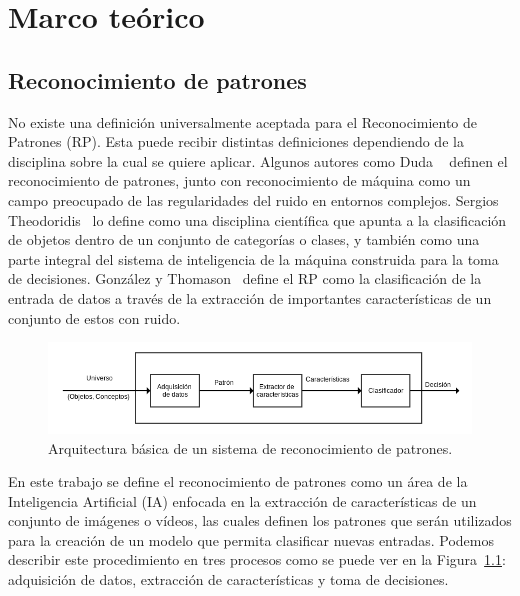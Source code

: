 \chapter[Marco teórico]{Marco teórico}
\label{ch:estado_del_arte}

\section{Reconocimiento de patrones}
\label{sec:rec_patrones}
	No existe una definición universalmente aceptada para el Reconocimiento de Patrones (RP). Esta puede recibir distintas definiciones dependiendo de la disciplina sobre la cual se quiere aplicar. Algunos autores como Duda \etal~\cite{Duda1973} definen el reconocimiento de patrones, junto con reconocimiento de máquina como un campo preocupado de las regularidades del ruido en entornos complejos. Sergios Theodoridis~\cite{Theodoridis2008} lo define como una disciplina científica que apunta a la clasificación de objetos dentro de un conjunto de categorías o clases, y también como una parte integral del sistema de inteligencia de la máquina construida para la toma de decisiones. González y Thomason~\cite{Gonzalez1978} define el RP como la clasificación de la entrada de datos a través de la extracción de importantes características de un conjunto de estos con ruido. 

\begin{figure}[b]
  \centering
   \includegraphics[width=1\textwidth]{Figuras/Diagramas/estado_del_arte/Reconocimiento_de_patrones.png}
  \caption{Arquitectura básica de un sistema de reconocimiento de patrones.}
  \label{art:fig:arquitectura}
\end{figure}


En este trabajo se define el reconocimiento de patrones como un área de la Inteligencia Artificial (IA) enfocada en la extracción de características de un conjunto de imágenes o vídeos, las cuales definen los patrones que serán utilizados para la creación de un modelo que permita clasificar nuevas entradas. Podemos describir este procedimiento en tres procesos como se puede ver en la Figura~\ref{art:fig:arquitectura}: adquisición de datos, extracción de características y toma de decisiones. 

